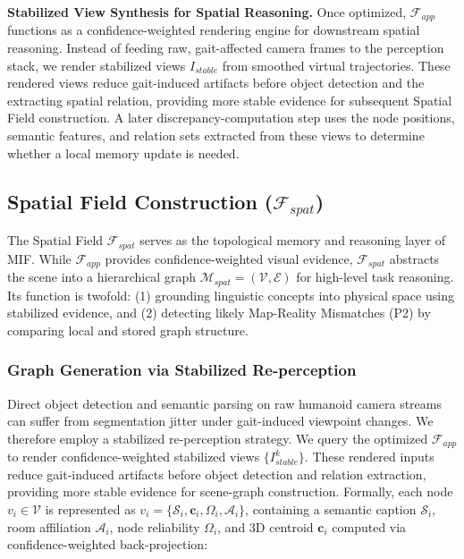 \documentclass[conference]{IEEEtran}
\begin{document}
\vspace{1mm}
\noindent \textbf{Stabilized View Synthesis for Spatial Reasoning.}
%
Once optimized, $\mathcal{F}_{app}$ functions as a confidence-weighted rendering engine for downstream spatial reasoning.
%
Instead of feeding raw, gait-affected camera frames to the perception stack, we render stabilized views $I_{stable}$ from smoothed virtual trajectories.
%
These rendered views reduce gait-induced artifacts before object detection and the extracting spatial relation, providing more stable evidence for subsequent Spatial Field construction.
%
A later discrepancy-computation step uses the node positions, semantic features, and relation sets extracted from these views to determine whether a local memory update is needed.



\subsection{Spatial Field Construction ($\mathcal{F}_{spat}$)}
\label{sec:spatial_field}

%
The Spatial Field $\mathcal{F}_{spat}$ serves as the topological memory and reasoning layer of MIF.
%
While $\mathcal{F}_{app}$ provides confidence-weighted visual evidence, $\mathcal{F}_{spat}$ abstracts the scene into a hierarchical graph $\mathcal{M}_{spat} = (\mathcal{V}, \mathcal{E})$ for high-level task reasoning.
%
Its function is twofold: (1) grounding linguistic concepts into physical space using stabilized evidence, and (2) detecting likely Map-Reality Mismatches (P2) by comparing local and stored graph structure.


\subsubsection{Graph Generation via Stabilized Re-perception}
%
Direct object detection and semantic parsing on raw humanoid camera streams can suffer from segmentation jitter under gait-induced viewpoint changes.
%
We therefore employ a stabilized re-perception strategy.
%
We query the optimized $\mathcal{F}_{app}$ to render confidence-weighted stabilized views $\{I_{stable}^k\}$.
%
These rendered inputs reduce gait-induced artifacts before object detection and relation extraction, providing more stable evidence for scene-graph construction.
%
Formally, each node $v_i \in \mathcal{V}$ is represented as $v_i = \{ \mathcal{S}_i, \mathbf{c}_i, \Omega_i, \mathcal{A}_i \}$, containing a semantic caption $\mathcal{S}_i$, room affiliation $\mathcal{A}_i$, node reliability $\Omega_i$, and 3D centroid $\mathbf{c}_i$ computed via confidence-weighted back-projection:
\end{document}
